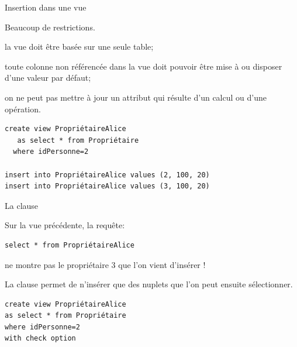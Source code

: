 \begin{frame}[fragile]{Insertion dans une vue}

Beaucoup de restrictions.


\vfill
\begin{redbullet}
  \item la vue doit être basée sur une seule table;
   \item toute colonne non référencée
    dans la vue doit pouvoir être mise à 
     ou disposer d'une valeur par défaut;
  \item on ne peut pas mettre à jour un attribut
    qui résulte d'un calcul ou d'une opération.
\end{redbullet}

\vfill

\begin{verbatim}
create view PropriétaireAlice
   as select * from Propriétaire
  where idPersonne=2

insert into PropriétaireAlice values (2, 100, 20)
insert into PropriétaireAlice values (3, 100, 20)
\end{verbatim}

\end{frame}


\begin{frame}[fragile]{La clause }

Sur la vue précédente, la requête:

\begin{verbatim}
select * from PropriétaireAlice
\end{verbatim}

ne montre pas le propriétaire 3 que l'on vient d'insérer !

\vfill

La clause  permet de n'insérer que des nuplets
que l'on peut ensuite sélectionner.


\begin{verbatim}
create view PropriétaireAlice
as select * from Propriétaire
where idPersonne=2
with check option
\end{verbatim}

\end{frame}

